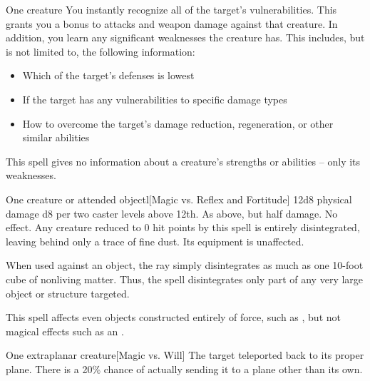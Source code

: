 \spellrng{\rngmed}
\begin{spelltarget}{One creature}
    \spelleffect You instantly recognize all of the target's vulnerabilities. This grants you a  bonus to attacks and weapon damage against that creature. In addition, you learn any significant weaknesses the creature has. This includes, but is not limited to, the following information:
    \begin{itemize}
        \item Which of the target's defenses is lowest
        \item If the target has any vulnerabilities to specific damage types
        \item How to overcome the target's damage reduction, regeneration, or other similar abilities
    \end{itemize}
\end{spelltarget}
\spellnotes This spell gives no information about a creature's strengths or abilities -- only its weaknesses.

\spellrng{\rngclose}
\begin{spelltarget}{One creature or attended object}l[Magic vs. Reflex and Fortitude]
    \spellsuccess 12d8 physical damage \add d8 per two caster levels above 12th.
    \spellfailure[Fortitude] As above, but half damage.
    \spellfailure[Reflex] No effect.
    \spelleffect Any creature reduced to 0 hit points by this spell is entirely disintegrated, leaving behind only a trace of fine dust. Its equipment is unaffected.
    \par When used against an object, the ray simply disintegrates as much as one 10-foot cube of nonliving matter. Thus, the spell disintegrates only part of any very large object or structure targeted.
\end{spelltarget}
\spellnotes This spell affects even objects constructed entirely of force, such as , but not magical effects such as an .

\spellrng{\rngclose}
\begin{spelltarget}{One extraplanar creature}[Magic vs. Will]
    \spellsuccess The target teleported back to its proper plane. There is a 20\% chance of actually sending it to a plane other than its own.
\end{spelltarget}

